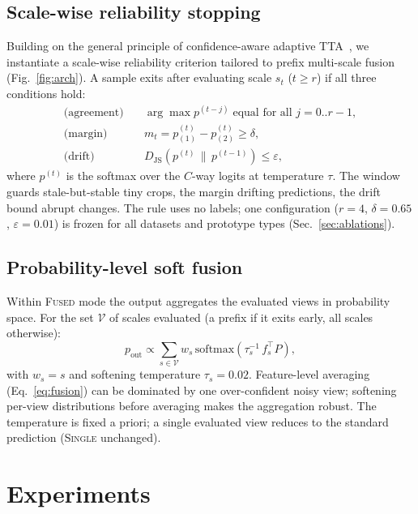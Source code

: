 \documentclass{article}
\begin{document}
\subsection{Scale-wise reliability stopping}
\label{sec:adascale}
Building on the general principle of confidence-aware adaptive
TTA~\cite{mocerino2021adaptta,son2023selective}, we instantiate a
scale-wise reliability criterion tailored to prefix multi-scale fusion
(Fig.~\ref{fig:arch}). A sample exits after evaluating scale $s_t$
($t \geq r$) if all three conditions hold:
\begin{align}
\text{(agreement)}\quad & \arg\max p^{(t-j)} \;\text{equal for all } j=0..r{-}1, \\
\text{(margin)}\quad & m_t = p^{(t)}_{(1)} - p^{(t)}_{(2)} \geq \delta, \\
\text{(drift)}\quad & D_{\mathrm{JS}}\!\left(p^{(t)} \,\|\, p^{(t-1)}\right) \leq \varepsilon,
\end{align}
where $p^{(t)}$ is the softmax over the $C$-way logits at temperature
$\tau$. The window guards stale-but-stable tiny crops, the margin
drifting predictions, the drift bound abrupt changes. The rule uses no
labels; one configuration ($r{=}4$, $\delta{=}0.65$, $\varepsilon{=}0.01$)
is frozen for all datasets and prototype types (Sec.~\ref{sec:ablations}).

\subsection{Probability-level soft fusion}
\label{sec:softfusion}
Within \textsc{Fused} mode the output aggregates the evaluated views in
probability space. For the set $\mathcal{V}$ of scales evaluated (a
prefix if it exits early, all scales otherwise):
\begin{equation}
p_{\text{out}} \propto \sum_{s \in \mathcal{V}} w_s \,
\mathrm{softmax}\!\left(\tau_s^{-1} \, f_s^\top P\right),
\label{eq:softfusion}
\end{equation}
with $w_s = s$ and softening temperature $\tau_s = 0.02$. Feature-level
averaging (Eq.~\ref{eq:fusion}) can be dominated by one over-confident
noisy view; softening per-view distributions before averaging makes the
aggregation robust. The temperature is fixed a priori; a single evaluated
view reduces to the standard prediction (\textsc{Single} unchanged).

\section{Experiments}
\label{sec:exp}
\end{document}
